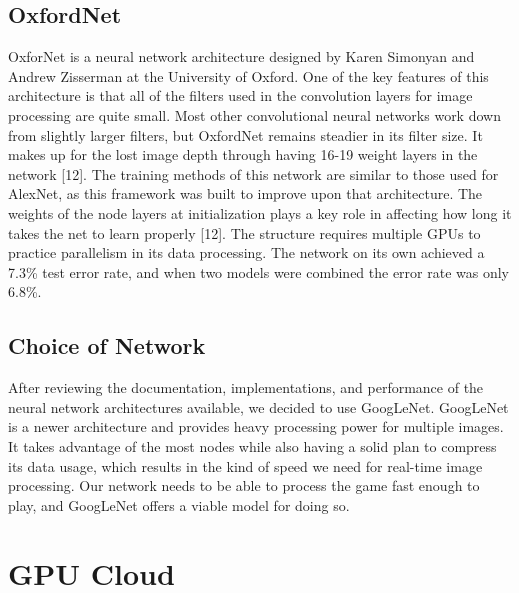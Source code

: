\documentclass{scrreprt}
\begin{document}
\subsection{OxfordNet}
OxforNet is a neural network architecture designed by Karen Simonyan and Andrew Zisserman
at the University of Oxford. One of the key features of this architecture is that all of the filters
used in the convolution layers for image processing are quite small. Most other convolutional
neural networks work down from slightly larger filters, but OxfordNet remains steadier in its
filter size. It makes up for the lost image depth through having 16-19 weight layers in the
network [12]. The training methods of this network are similar to those used for AlexNet, as this
framework was built to improve upon that architecture. The weights of the node layers at
initialization plays a key role in affecting how long it takes the net to learn properly [12]. The
structure requires multiple GPUs to practice parallelism in its data processing. The network on
its own achieved a 7.3\% test error rate, and when two models were combined the error rate was
only 6.8\%.


\subsection{Choice of Network}
After reviewing the documentation, implementations, and performance of the neural network
architectures available, we decided to use GoogLeNet. GoogLeNet is a newer architecture and
provides heavy processing power for multiple images. It takes advantage of the most nodes while
also having a solid plan to compress its data usage, which results in the kind of speed we need
for real-time image processing. Our network needs to be able to process the game fast enough to
play, and GoogLeNet offers a viable model for doing so.

\section{GPU Cloud}
\end{document}
